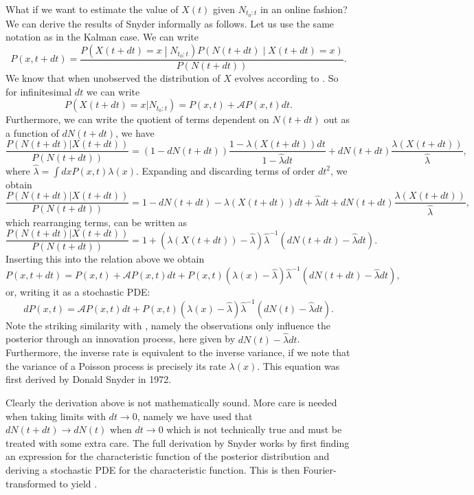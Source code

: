 \par
What if we want to estimate the value of $X(t)$ given $N_{t_0:t}$ in an online fashion? We can derive the results of Snyder informally as follows. Let us use the same notation as in the Kalman case. We can write
\[
P(x,t+dt) =\frac{ P\left(X(t+dt)=x\middle|N_{t_0:t}\right)P\left(N(t+dt)\middle|X(t+dt)=x\right)}{P(N(t+dt))}.
\]
We know that when unobserved the distribution of $X$ evolves according to . So for infinitesimal $dt$ we can write 
\[
P(X(t+dt)=x|N_{t_0:t}) = P(x,t) + \mathcal{A}P(x,t) dt.
\]
Furthermore, we can write the quotient of terms dependent on $N(t+dt)$ out as a function of $dN(t+dt)$, we have
\[
\frac{P(N(t+dt)|X(t+dt))}{P(N(t+dt))} = (1-dN(t+dt))\frac{1-\lambda(X(t+dt))dt}{1-\hat{\lambda}dt} + dN(t+dt)\frac{\lambda(X(t+dt))}{\hat{\lambda}},
\]
where $\hat{\lambda} = \int dx P(x,t) \lambda(x)$. Expanding and discarding terms of order $dt^2$, we obtain
\[
\frac{P(N(t+dt)|X(t+dt))}{P(N(t+dt))} = 1-dN(t+dt) -\lambda(X(t+dt))dt +\hat{\lambda}dt +dN(t+dt)\frac{\lambda(X(t+dt))}{\hat{\lambda}},
\]
which rearranging terms, can be written as
\[
\frac{P(N(t+dt)|X(t+dt))}{P(N(t+dt))} = 1 + \left(\lambda(X(t+dt))-\hat{\lambda}\right)\hat{\lambda}^{-1}\left(dN(t+dt)-\hat{\lambda} dt\right).
\]
Inserting this into the relation above we obtain
\[
P(x,t+dt) = P(x,t) +\mathcal{A} P(x,t) dt + P(x,t)\left(\lambda(x)-\hat{\lambda}\right)\hat{\lambda}^{-1}\left(dN(t+dt)-\hat{\lambda} dt\right),
\]
or, writing it as a stochastic PDE:
\begin{equation}
\label{eq:snyder_uni}
dP(x,t) = \mathcal{A}P(x,t) dt + P(x,t)\left(\lambda(x)-\hat{\lambda}\right)\hat{\lambda}^{-1}\left(dN(t)-\hat{\lambda} dt\right).
\end{equation}
Note the striking similarity with , namely the observations only influence the posterior through an innovation process, here given by $dN(t)-\hat{\lambda}dt$. Furthermore, the inverse rate is equivalent to the inverse variance, if we note that the variance of a Poisson process is precisely its rate $\lambda(x)$. This equation was first derived by Donald Snyder in 1972.\cite{Snyder1972}
\par
Clearly the derivation above is not mathematically sound. More care is needed when taking limits with $dt\to 0$, namely we have used that $dN(t+dt) \to dN(t)$ when $dt\to 0$ which is not technically true and must be treated with some extra care. The full derivation by Snyder works by first finding an expression for the characteristic function of the posterior distribution and deriving a stochastic PDE for the characteristic function. This is then Fourier-transformed to yield .

